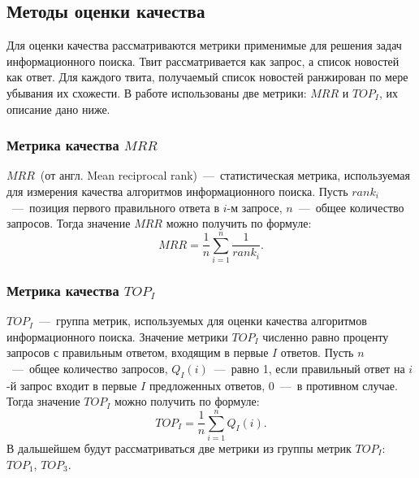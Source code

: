 \subsection{Методы оценки качества}
    Для оценки качества рассматриваются метрики применимые для решения задач информационного поиска.
    Твит рассматривается как запрос, а список новостей как ответ. 
    Для каждого твита, получаемый список новостей ранжирован по мере убывания их схожести.
    В работе использованы две метрики: $MRR$ и $TOP_I$, их описание дано ниже.

    \subsubsection{Метрика качества $MRR$}
    \label{subsubsec:MRR}
        $MRR$~(от англ. Mean reciprocal rank)~---~статистическая метрика, используемая для измерения качества алгоритмов информационного поиска.
        Пусть $rank_i$~---~позиция первого правильного ответа в $i$-м запросе, $n$~---~общее количество запросов.
        Тогда значение $MRR$ можно получить по формуле:
        \begin{equation}
            MRR = \dfrac{1}{n} \sum_{i=1}^n \dfrac{1}{rank_i}.
        \end{equation}

    \subsubsection{Метрика качества $TOP_I$}
        $TOP_I$~---~группа метрик, используемых для оценки качества алгоритмов информационного поиска. Значение метрики $TOP_I$
        численно равно проценту запросов с правильным ответом, входящим в первые $I$ ответов.
        Пусть $n$~---~общее количество запросов, $Q_I(i)$~---~равно 1, если правильный ответ на $i$-й запрос входит в первые $I$ предложенных ответов, 0~---~в противном случае.
        Тогда значение $TOP_I$ можно получить по формуле:
        \begin{equation}
            TOP_I=\dfrac{1} {n} \sum_{i=1}^n Q_I(i).
        \end{equation}
        В дальшейшем будут рассматриваться две метрики из группы метрик $TOP_I$: $TOP_1$, $TOP_3$.


